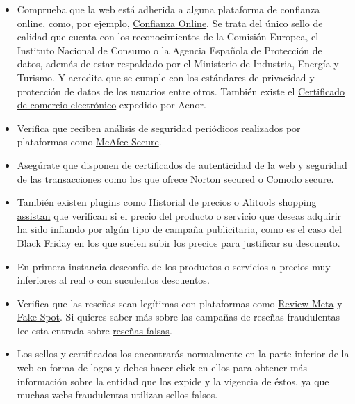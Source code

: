 \documentclass[
  spanish,
  a4paper,
  openany]{book}
\begin{document}
\begin{itemize}
  \begin{itemize}
  \item
    Comprueba que la web está adherida a alguna plataforma de confianza online, como, por ejemplo, \href{https://www.confianzaonline.es/}{Confianza Online}. Se trata del único sello de calidad que cuenta con los reconocimientos de la Comisión Europea, el Instituto Nacional de Consumo o la Agencia Española de Protección de datos, además de estar respaldado por el Ministerio de Industria, Energía y Turismo. Y acredita que se cumple con los estándares de privacidad y protección de datos de los usuarios entre otros. También existe el \href{https://www.aenor.com/certificacion/tecnologias-de-la-informacion/buenas-practicas-comercio-electronico}{Certificado de comercio electrónico} expedido por Aenor.
  \item
    Verifica que reciben análisis de seguridad periódicos realizados por plataformas como \href{https://www.mcafeesecure.com/certification}{McAfee Secure}.
  \item
    Asegúrate que disponen de certificados de autenticidad de la web y seguridad de las transacciones como los que ofrece \href{https://es.norton.com/internet-security}{Norton secured} o \href{https://www.comodo.com/home/internet-security/secure-shopping.php}{Comodo secure}.
  \item
    También existen plugins como \href{https://chrome.google.com/webstore/detail/historial-de-precios/fdeopiliemdomncemeibjpmccgmnkfig?hl=es-419\&authuser=0}{Historial de precios} o \href{https://chrome.google.com/webstore/detail/alitools-shopping-assista/eenflijjbchafephdplkdmeenekabdfb?hl=es-419\&authuser=0}{Alitools shopping assistan} que verifican si el precio del producto o servicio que deseas adquirir ha sido inflando por algún tipo de campaña publicitaria, como es el caso del Black Friday en los que suelen subir los precios para justificar su descuento.
  \item
    En primera instancia desconfía de los productos o servicios a precios muy inferiores al real o con suculentos descuentos.
  \item
    Verifica que las reseñas sean legítimas con plataformas como \href{https://reviewmeta.com/}{Review Meta} y \href{https://www.fakespot.com/}{Fake Spot}. Si quieres saber más sobre las campañas de reseñas fraudulentas lee esta entrada sobre \href{https://www.genbeta.com/actualidad/asi-incentivaban-a-crear-resenas-falsas-proveedores-chinos-baneados-amazon}{reseñas falsas}.
  \item
    Los sellos y certificados los encontrarás normalmente en la parte inferior de la web en forma de logos y debes hacer click en ellos para obtener más información sobre la entidad que los expide y la vigencia de éstos, ya que muchas webs fraudulentas utilizan sellos falsos.
  \end{itemize}
\end{itemize}
\end{document}

